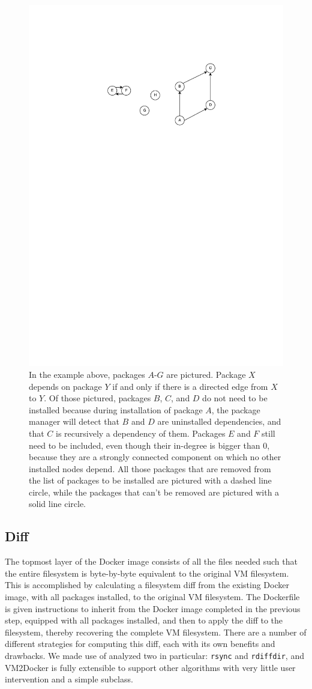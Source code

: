 \begin{figure}[h]
\centering
   \label{fig:depgraph}
    \includegraphics[width=.6\textwidth]{depgraph.pdf}
    \caption{In the example above, packages $A$-$G$ are pictured. Package $X$ depends on package $Y$ if and only if there is a directed edge from $X$ to $Y$. Of those pictured, packages $B$, $C$, and $D$ do not need to be installed because during installation of package $A$, the package manager will detect that $B$ and $D$ are uninstalled dependencies, and that $C$ is recursively a dependency of them. Packages $E$ and $F$ still need to be included, even though their in-degree is bigger than 0, because they are a strongly connected component on which no other installed nodes depend. All those packages that are removed from the list of packages to be installed are pictured with a dashed line circle, while the packages that can't be removed are pictured with a solid line circle.}
\end{figure}

\subsection{Diff}
\label{sec:diff}
The topmost layer of the Docker image consists of all the files needed such that the entire filesystem is byte-by-byte equivalent to the original VM filesystem. This is accomplished by calculating a filesystem diff from the existing Docker image, with all packages installed, to the original VM filesystem. The Dockerfile is given instructions to inherit from the Docker image completed in the previous step, equipped with all packages installed, and then to apply the diff to the filesystem, thereby recovering the complete VM filesystem. There are a number of different strategies for computing this diff, each with its own benefits and drawbacks. We made use of analyzed two in particular: \texttt{rsync} and \texttt{rdiffdir}, and VM2Docker is fully extensible to support other algorithms with very little user intervention and a simple subclass.


